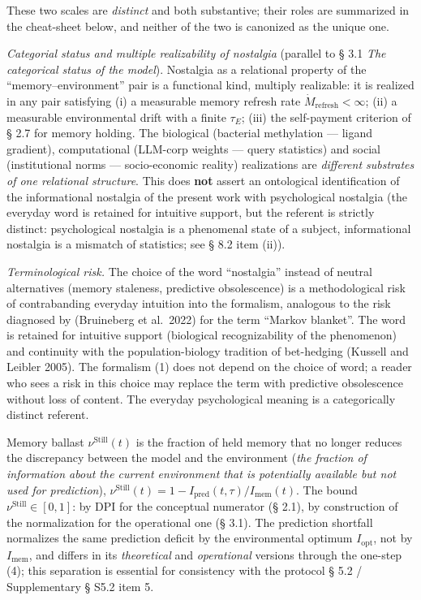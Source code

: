 \documentclass[pdflatex,sn-mathphys-ay]{sn-jnl}
\providecommand{\lt}{<}\providecommand{\gt}{>}
\begin{document}
These two scales are \emph{distinct} and both substantive; their roles are summarized in the cheat-sheet below, and neither of the two is canonized as the unique one.



\emph{Categorial status and multiple realizability of nostalgia} (parallel to § 3.1 \emph{The categorical status of the model}). Nostalgia as a relational property of the ``memory--environment'' pair is a functional kind, multiply realizable: it is realized in any pair satisfying (i) a measurable memory refresh rate \(\dot{M}_{\text{refresh}} \lt \infty\); (ii) a measurable environmental drift with a finite \(\tau_E\); (iii) the self-payment criterion of § 2.7 for memory holding. The biological (bacterial methylation --- ligand gradient), computational (LLM-corp weights --- query statistics) and social (institutional norms --- socio-economic reality) realizations are \emph{different substrates of one relational structure}. This does \textbf{not} assert an ontological identification of the informational nostalgia of the present work with psychological nostalgia (the everyday word is retained for intuitive support, but the referent is strictly distinct: psychological nostalgia is a phenomenal state of a subject, informational nostalgia is a mismatch of statistics; see § 8.2 item (ii)).



\emph{Terminological risk.} The choice of the word ``nostalgia'' instead of neutral alternatives (memory staleness, predictive obsolescence) is a methodological risk of contrabanding everyday intuition into the formalism, analogous to the risk diagnosed by (Bruineberg et al.~2022) for the term ``Markov blanket''. The word is retained for intuitive support (biological recognizability of the phenomenon) and continuity with the population-biology tradition of bet-hedging (Kussell and Leibler 2005). The formalism (1) does not depend on the choice of word; a reader who sees a risk in this choice may replace the term with predictive obsolescence without loss of content. The everyday psychological meaning is a categorically distinct referent.



Memory ballast \(\nu^{\text{Still}}(t)\) is the fraction of held memory that no longer reduces the discrepancy between the model and the environment (\emph{the fraction of information about the current environment that is potentially available but not used for prediction}), \(\nu^{\text{Still}}(t) = 1 - I_{\text{pred}}(t,\tau)/I_{\text{mem}}(t)\). The bound \(\nu^{\text{Still}} \in [0,1]\): by DPI for the conceptual numerator (§ 2.1), by construction of the normalization for the operational one (§ 3.1). The prediction shortfall normalizes the same prediction deficit by the environmental optimum \(I_{\text{opt}}\), not by \(I_{\text{mem}}\), and differs in its \emph{theoretical} and \emph{operational} versions through the one-step (4); this separation is essential for consistency with the protocol § 5.2 / Supplementary § S5.2 item 5.
\end{document}
